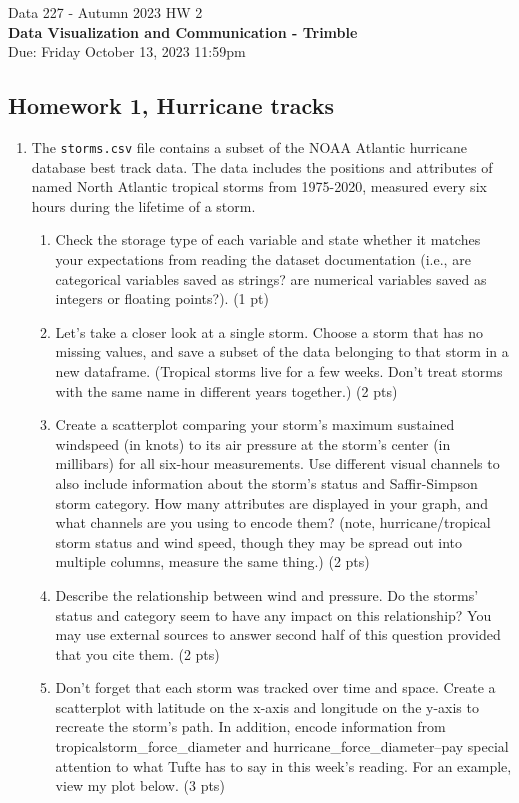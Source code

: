 \documentclass[]{book}
\theoremstyle{definition}
\begin{document}
\begin{center}
{\Large Data 227 - Autumn 2023 \hspace{0.5cm} HW 2}\\
\textbf{Data Visualization and Communication - Trimble}\\ %
Due: Friday October 13, 2023  11:59pm   
\end{center}

\vspace{0.2 cm}

\subsection*{Homework 1, Hurricane tracks}

\begin{enumerate}
\item\label{hurricane}

The \texttt{storms.csv} file contains a subset of the NOAA Atlantic hurricane database best track data. The data includes the positions and attributes of named North Atlantic tropical storms from 1975-2020, measured every six hours during the lifetime of a storm. 

\begin{enumerate}
\item
Check the storage type of each variable and state whether it matches your expectations from reading the dataset documentation (i.e., are categorical variables saved as strings? are numerical variables saved as integers or floating points?). (1 pt)

\item Let’s take a closer look at a single storm. Choose a storm that has no missing values, and save a subset of the data belonging to that storm in a new dataframe. (Tropical storms live for a few weeks.  Don't treat storms with the same name in different years together.) (2 pts)
\item  Create a scatterplot comparing your storm’s maximum sustained windspeed (in knots) to its air pressure at the storm’s center (in millibars) for all six-hour measurements. Use different visual channels to also include information about the storm’s status and Saffir-Simpson storm category. How many attributes are displayed in your graph, and what channels are you using to encode them?  (note, hurricane/tropical storm status and wind speed, though they may be spread out into multiple columns, measure the same thing.)  (2 pts)
\item Describe the relationship between wind and pressure. Do the storms’ status and category seem to have any impact on this relationship? You may use external sources to answer second half of this question provided that you cite them. (2 pts)
\item Don’t forget that each storm was tracked over time and space. Create a scatterplot with latitude on the x-axis and longitude on the y-axis to recreate the storm’s path. In addition, encode information from tropicalstorm\_force\_diameter and hurricane\_force\_diameter–pay special attention to what Tufte has to say in this week’s reading. For an example, view my plot below. (3 pts)


\end{enumerate}
\end{enumerate}
\end{document}
